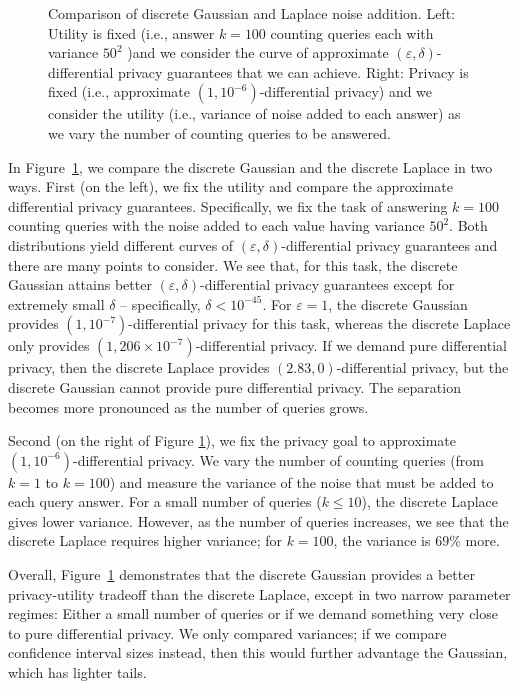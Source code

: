 \documentclass{jpc}
\begin{document}
\begin{figure}[ht!]
\begin{minipage}{0.5\textwidth}
    \end{minipage}
    \caption{\label{fig:gausslaplace} Comparison of discrete Gaussian and Laplace noise addition. Left: Utility is fixed (i.e., answer $k=100$ counting queries each with variance $50^2$ )and we consider the curve of approximate $(\varepsilon,\delta)$-differential privacy guarantees that we can achieve. Right: Privacy is fixed (i.e., approximate $(1,10^{-6})$-differential privacy) and we consider the utility (i.e., variance of noise added to each answer) as we vary the number of counting queries to be answered.}
\end{figure}

In Figure~\ref{fig:gausslaplace}, we compare the discrete Gaussian and the discrete Laplace in two ways. First (on the left), we fix the utility and compare the approximate differential privacy guarantees. Specifically, we fix the task of answering $k=100$ counting queries with the noise added to each value having variance $50^2$. Both distributions yield different curves of $(\varepsilon,\delta)$-differential privacy guarantees and there are many points to consider. We see that, for this task, the discrete Gaussian attains better $(\varepsilon,\delta)$-differential privacy guarantees except for extremely small $\delta$ -- specifically, $\delta<10^{-45}$. For $\varepsilon=1$, the discrete Gaussian provides $(1,10^{-7})$-differential privacy for this task, whereas the discrete Laplace only provides $(1,206 \times 10^{-7})$-differential privacy. If we demand pure differential privacy, then the discrete Laplace provides $(2.83,0)$-differential privacy, but the discrete Gaussian cannot provide pure differential privacy. The separation becomes more pronounced as the number of queries grows.

Second (on the right of Figure \ref{fig:gausslaplace}), we fix the privacy goal to approximate $(1,10^{-6})$-differential privacy. We vary the number of counting queries (from $k=1$ to $k=100$) and measure the variance of the noise that must be added to each query answer. For a small number of queries ($k \le 10$), the discrete Laplace gives lower variance. However, as the number of queries increases, we see that the discrete Laplace requires higher variance; for $k=100$, the variance is $69\%$ more.

Overall, Figure~\ref{fig:gausslaplace} demonstrates that the discrete Gaussian provides a better privacy-utility tradeoff than the discrete Laplace, except in two narrow parameter regimes: Either a small number of queries or if we demand something very close to pure differential privacy. We only compared variances; if we compare confidence interval sizes instead, then this would further advantage the Gaussian, which has lighter tails.
\end{document}
